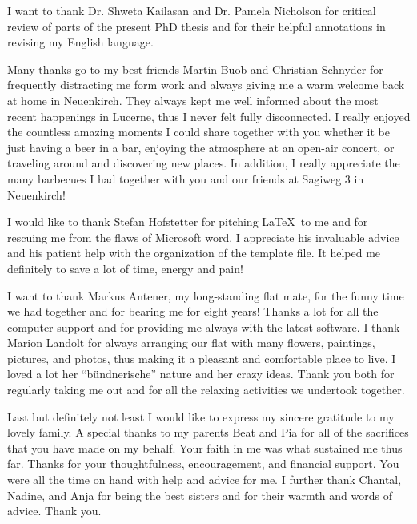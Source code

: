 \begin{addmargin}{0.025\textwidth}
\par\medskip 
\noindent
I want to thank Dr. Shweta Kailasan and Dr. Pamela Nicholson for critical review of parts of the present PhD thesis and for their helpful annotations in revising my English language. 
   

\par\medskip 
\noindent
Many thanks go to my best friends Martin Buob and Christian Schnyder for frequently distracting me form work and always giving me a warm welcome back at home in Neuenkirch. They always kept me well informed about the most recent happenings in Lucerne, thus I never felt fully disconnected. I really enjoyed the countless amazing moments I could share together with you whether it be just having a beer in a bar, enjoying the atmosphere at an open-air concert, or traveling around and discovering new places. In addition, I really appreciate the many barbecues I had together with you and our friends at Sagiweg 3 in Neuenkirch!            


\par\medskip 
\noindent
I would like to thank Stefan Hofstetter for pitching \LaTeX~to me and for rescuing me from the flaws of Microsoft word. I appreciate his invaluable advice and his patient help with the organization of the template file. It helped me definitely to save a lot of time, energy and pain! 

\par\medskip 
\noindent
I want to thank Markus Antener, my long-standing flat mate, for the funny time we had together and for bearing me for eight years! Thanks a lot for all the computer support and for providing me always with the latest software. I thank Marion Landolt for always arranging our flat with many flowers, paintings, pictures, and photos, thus making it a pleasant and comfortable place to live. I loved a lot her ``bündnerische'' nature and her crazy ideas. Thank you both for regularly taking me out and for all the relaxing activities we undertook together.

\par\medskip 
\noindent
Last but definitely not least I would like to express my sincere gratitude to my lovely family. A special thanks to my parents Beat and Pia for all of the sacrifices that you have made on my behalf. Your faith in me was what sustained me thus far. Thanks for your thoughtfulness, encouragement, and financial support. You were all the time on hand with help and advice for me. I further thank Chantal, Nadine, and Anja for being the best sisters and for their warmth and words of advice. Thank you.  



\end{addmargin}
